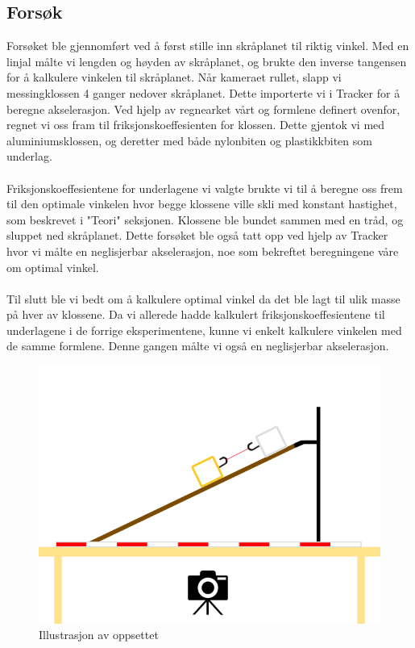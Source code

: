 \documentclass[10pt,a4paper]{report}
\begin{document}
\subsection*{Forsøk}
Forsøket ble gjennomført ved å først stille inn skråplanet til riktig vinkel. Med en linjal målte vi lengden og høyden av skråplanet, og brukte den inverse tangensen for å kalkulere vinkelen til skråplanet. Når kameraet rullet, slapp vi messingklossen 4 ganger nedover skråplanet. Dette importerte vi i Tracker for å beregne akselerasjon. Ved hjelp av regnearket vårt og formlene definert ovenfor, regnet vi oss fram til friksjonskoeffesienten for klossen. Dette gjentok vi med aluminiumsklossen, og deretter med både nylonbiten og plastikkbiten som underlag. \\
\\Friksjonskoeffesientene for underlagene vi valgte brukte vi til å beregne oss frem til den optimale vinkelen hvor begge klossene ville skli med konstant hastighet, som beskrevet i "Teori" seksjonen. Klossene ble bundet sammen med en tråd, og sluppet ned skråplanet. Dette forsøket ble også tatt opp ved hjelp av Tracker hvor vi målte en neglisjerbar akselerasjon, noe som bekreftet beregningene våre om optimal vinkel.\\
\\Til slutt ble vi bedt om å kalkulere optimal vinkel da det ble lagt til ulik masse på hver av klossene. Da vi allerede hadde kalkulert friksjonskoeffesientene til underlagene i de forrige eksperimentene, kunne vi enkelt kalkulere vinkelen med de samme formlene. Denne gangen målte vi også en neglisjerbar akselerasjon.

\begin{figure}
\centerline{\includegraphics[scale=0.5]{oppsett}}
\caption{Illustrasjon av oppsettet}
\label{oppsett}
\end{figure}
\end{document}
